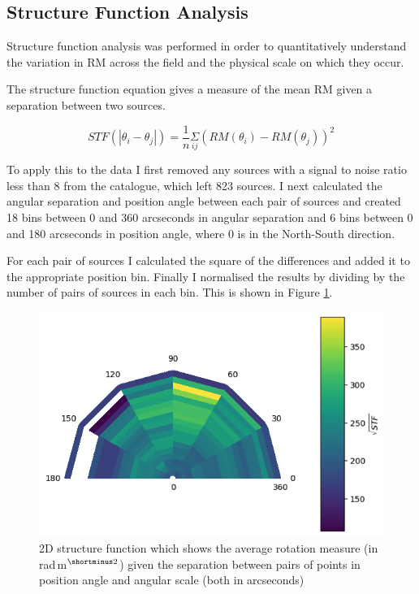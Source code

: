 \subsection{Structure Function Analysis}

Structure function analysis was performed in order to quantitatively understand the variation in RM across the field and the physical scale on which they occur.

The structure function equation gives a measure of the mean RM given a separation between two sources.

\begin{equation}
    STF(|\theta_i - \theta_j|) = \frac{1}{n}\underset{ij}{\Sigma}(RM(\theta_i) - RM(\theta_j))^2
    \label{Structure Function}
\end{equation}

To apply this to the data I first removed any sources with a signal to noise ratio less than 8 from the catalogue, which left 823 sources. I next calculated the angular separation and position angle between each pair of sources and created 18 bins between 0 and 360 arcseconds in angular separation and 6 bins between 0 and 180 arcseconds in position angle, where 0 is in the North-South direction. 

For each pair of sources I calculated the square of the differences and added it to the appropriate position bin. Finally I normalised the results by dividing by the number of pairs of sources in each bin. This is shown in Figure \ref{fig:2d_stf}. 



\begin{figure}
        \centering
        \includegraphics[width=\linewidth]{Thesis_Template/Figures/2D_STF.png}
        \caption{2D structure function which shows the average rotation measure (in rad$\,$m$^{\shortminus2}$) given the separation between pairs of points in position angle and angular scale (both in arcseconds)}
        \label{fig:2d_stf}
    \end{figure}

